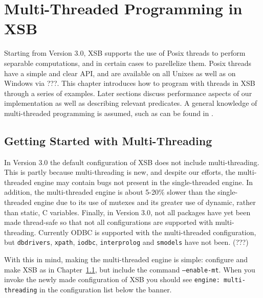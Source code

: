 \chapter{Multi-Threaded Programming in XSB} \label{chap:threads}

Starting from Version 3.0, XSB supports the use of Posix threads to
perform separable computations, and in certain cases to parellelize
them.  Posix threads have a simple and clear API, and are available on
all Unixes as well as on Windows via ???.  This chapter introduces how
to program with threads in XSB through a series of examples.  Later
sections discuss performance aspects of our implementation as well as
describing relevant predicates.  A general knowledge of multi-threaded
programming is assumed, such as can be found in \cite{LewB98}.

\section{Getting Started with Multi-Threading}
%
In Version 3.0 the default configuration of XSB does not include
multi-threading.  This is partly because multi-threading is new, and
despite our efforts, the multi-threaded engine may contain bugs not
present in the single-threaded engine.  In addition, the
multi-threaded engine is about 5-20\% slower than the single-threaded
engine due to its use of mutexes and its greater use of dynamic,
rather than static, C variables.  Finally, in Version 3.0, not all
packages have yet been made thread-safe so that not all configurations
are supported with multi-threading.  Currently ODBC is supported with
the multi-threaded configuration, but {\tt dbdrivers}, {\tt xpath},
{\tt iodbc}, {\tt interprolog} and {\tt smodels} have not been. (???)

With this in mind, making the multi-threaded engine is simple:
configure and make XSB as in Chapter~\ref{}, but include the command
{\tt --enable-mt}.  When you invoke the newly made configuration of
XSB you should see {\tt engine: multi-threading} in the configuration
list below the banner.

